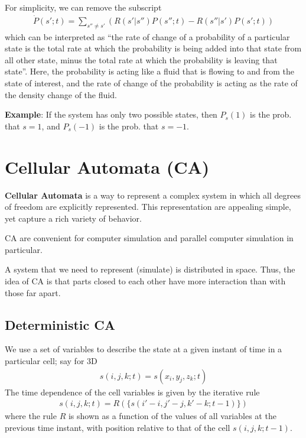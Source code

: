 For simplicity, we can remove the subscript
\begin{eqnarray}
  \label{eq:338}
    \dot{P}(s';t) = \sum_{s''\ne s'} \left(
    R(s'|s'') P(s'';t)  -
    R(s''|s') P(s';t) \right)
\end{eqnarray}
which can be interpreted as ``the rate of change of a probability of a
particular state is the total rate at which the probability is being
added into that state from all other state, minus the total rate at
which the probability is leaving that state''. Here, the probability
is acting like a fluid that is flowing to and from the state of
interest, and the rate of change of the probability is acting as the
rate of the density change of the fluid. 


{\bf Example}: If the system has only two possible states, then
$P_s(1)$ is the prob. that $s=1$, and $P_s(-1)$ is the prob. that
$s=-1$.

\section{Cellular Automata (CA)}
\label{sec:cellular-automata-ca}

{\bf Cellular Automata} is a way to represent a complex system in
which all degrees of freedom are explicitly represented.
This representation are appealing simple, yet capture a rich variety
of behavior.

CA are convenient for computer simulation and parallel computer
simulation in particular.

A system that we need to represent (simulate) is distributed in
space. Thus, the idea of CA is that parts closed to each other have
more interaction than with those far apart.

\subsection{Deterministic CA}
\label{sec:deterministic-ca}

We use a set of variables to describe the state at a given instant of
time in a particular cell; say for 3D
\begin{eqnarray}
  \label{eq:418}
  s(i,j,k; t) = s(x_i,y_j,z_k; t)
\end{eqnarray}
The time dependence of the cell variables is given by the iterative rule
\begin{eqnarray}
  \label{eq:419}
  s(i,j,k; t) = R(\{ s(i'-i, j'-j, k'-k; t-1)\})
\end{eqnarray}
where the rule $R$ is shown as a function of the values of all
variables at the previous time instant, with position relative to that
of the cell $s(i,j,k; t-1)$.

